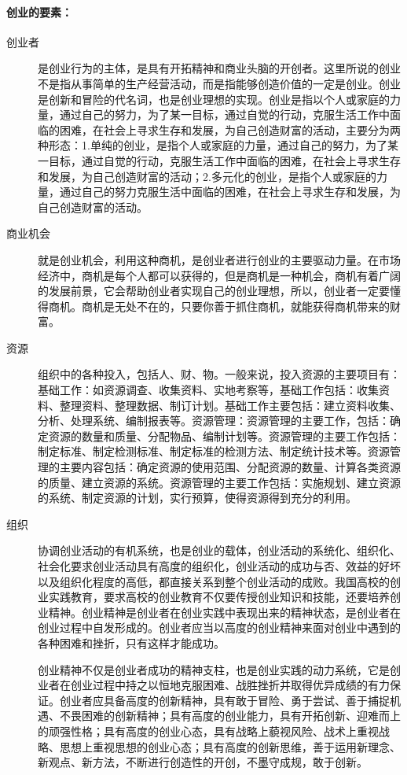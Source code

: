 \documentclass[UTF8]{article}
\begin{document}
\paragraph{创业的要素：}
\begin{description}
\item[创业者]是创业行为的主体，是具有开拓精神和商业头脑的开创者。这里所说的创业不是指从事简单的生产经营活动，而是指能够创造价值的一定是创业。创业是创新和冒险的代名词，也是创业理想的实现。创业是指以个人或家庭的力量，通过自己的努力，为了某一目标，通过自觉的行动，克服生活工作中面临的困难，在社会上寻求生存和发展，为自己创造财富的活动，主要分为两种形态：1.单纯的创业，是指个人或家庭的力量，通过自己的努力，为了某一目标，通过自觉的行动，克服生活工作中面临的困难，在社会上寻求生存和发展，为自己创造财富的活动；2.多元化的创业，是指个人或家庭的力量，通过自己的努力克服生活中面临的困难，在社会上寻求生存和发展，为自己创造财富的活动。
\item[商业机会]就是创业机会，利用这种商机，是创业者进行创业的主要驱动力量。在市场经济中，商机是每个人都可以获得的，但是商机是一种机会，商机有着广阔的发展前景，它会帮助创业者实现自己的创业理想，所以，创业者一定要懂得商机。商机是无处不在的，只要你善于抓住商机，就能获得商机带来的财富。
\item[资源]组织中的各种投入，包括人、财、物。一般来说，投入资源的主要项目有：基础工作：如资源调查、收集资料、实地考察等，基础工作包括：收集资料、整理资料、整理数据、制订计划。基础工作主要包括：建立资料收集、分析、处理系统、编制报表等。资源管理：资源管理的主要工作，包括：确定资源的数量和质量、分配物品、编制计划等。资源管理的主要工作包括：制定标准、制定检测标准、制定标准的检测方法、制定统计技术等。资源管理的主要内容包括：确定资源的使用范围、分配资源的数量、计算各类资源的质量、建立资源的系统。资源管理的主要工作包括：实施规划、建立资源的系统、制定资源的计划，实行预算，使得资源得到充分的利用。
\item[组织]协调创业活动的有机系统，也是创业的载体，创业活动的系统化、组织化、社会化要求创业活动具有高度的组织化，创业活动的成功与否、效益的好坏以及组织化程度的高低，都直接关系到整个创业活动的成败。我国高校的创业实践教育，要求高校的创业教育不仅要传授创业知识和技能，还要培养创业精神。创业精神是创业者在创业实践中表现出来的精神状态，是创业者在创业过程中自发形成的。创业者应当以高度的创业精神来面对创业中遇到的各种困难和挫折，只有这样才能成功。

创业精神不仅是创业者成功的精神支柱，也是创业实践的动力系统，它是创业者在创业过程中持之以恒地克服困难、战胜挫折并取得优异成绩的有力保证。创业者应具备高度的创新精神，具有敢于冒险、勇于尝试、善于捕捉机遇、不畏困难的创新精神；具有高度的创业能力，具有开拓创新、迎难而上的顽强性格；具有高度的创业心态，具有战略上藐视风险、战术上重视战略、思想上重视思想的创业心态；具有高度的创新思维，善于运用新理念、新观点、新方法，不断进行创造性的开创，不墨守成规，敢于创新。
\end{description}
\end{document}
